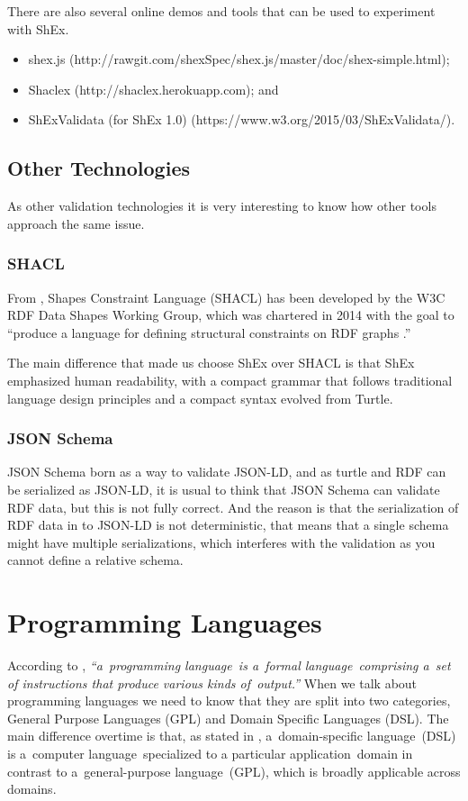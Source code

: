 There are also several online demos and tools that can be used to experiment with ShEx.

\begin{itemize}
	\item shex.js (http://rawgit.com/shexSpec/shex.js/master/doc/shex-simple.html);
	\item Shaclex (http://shaclex.herokuapp.com); and
	\item ShExValidata (for ShEx 1.0) (https://www.w3.org/2015/03/ShExValidata/).
\end{itemize}

\subsection{Other Technologies}
\label{subs:theo-back-validating-other-techs}
As other validation technologies it is very interesting to know how
other tools approach the same issue.

\subsubsection{SHACL}
From \cite{labra-validating-rdf}, Shapes Constraint Language (SHACL)
has been developed by the W3C RDF Data Shapes Working Group, which was chartered in 2014 with the goal to “produce
a language for defining structural constraints on RDF graphs \cite{oslc-resource-shape}.”

The main difference that made us choose ShEx over SHACL is that ShEx emphasized human readability, with a
compact grammar that follows traditional language design principles and a compact syntax evolved from Turtle.

\subsubsection{JSON Schema}
JSON Schema born as a way to validate JSON-LD, and as turtle and RDF can be serialized as JSON-LD, it is usual to
think that JSON Schema can validate RDF data, but this is not fully correct. And the reason is that the serialization
of RDF data in to JSON-LD is not deterministic, that means that a single schema might have multiple serializations,
which interferes with the validation as you cannot define a relative schema.


\section{Programming Languages}
According to \cite{programing-language}, \textit{“a programming language is a formal language comprising a set of instructions
that produce various kinds of output.”} When we talk about programming languages we need to know that they are split into
two categories, General Purpose Languages (GPL) and Domain Specific Languages (DSL). The main difference overtime is that, as stated
in \cite{dsl}, a domain-specific language (DSL) is a computer language specialized to a particular application domain
in contrast to a general-purpose language (GPL), which is broadly applicable across domains.

